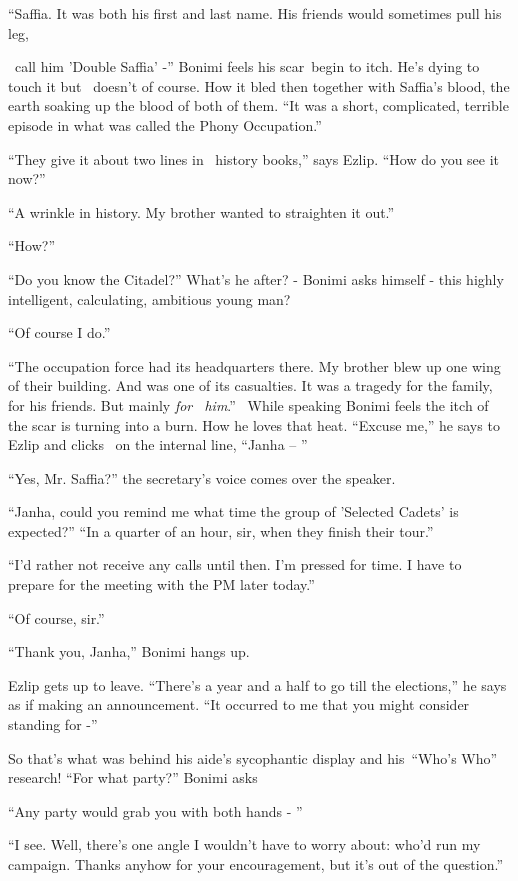 \documentclass[twoside,11pt]{book}
\begin{document}
``Saffia. It was both his first and last name. His friends would sometimes pull his leg,

\ call him 'Double Saffia' -'' Bonimi feels his scar~begin to itch. He's dying to touch it but \ doesn't of
course. How it bled then together with Saffia's blood, the earth soaking up the blood of both of them.
``It was a short, complicated, terrible episode in what was called the Phony Occupation.''

``They give it about two lines in \ history books,'' says Ezlip. ``How do you see
it now?''

``A wrinkle in history. My brother wanted to straighten it out.''

``How?''

``Do you know the Citadel?'' What's he after? - Bonimi asks himself - this highly intelligent,
calculating, ambitious young man?

``Of course I do.''

``The occupation force had its headquarters there. My brother blew up one wing of their building. And was
one of its casualties. It was a tragedy for the family, for his friends. But mainly \textit{for \ him}.''
\ While speaking Bonimi feels the itch of the scar is turning into a burn. How he loves that heat.
``Excuse me,'' he says to Ezlip and clicks \ on the internal line, ``Janha --
''

``Yes, Mr. Saffia?'' the secretary's voice comes over the speaker.

``Janha, could you remind me what time the group of 'Selected Cadets'{ }is
expected?'' ``In a quarter of an hour, sir, when they finish their tour.''

``I'd rather not receive any calls until then. I'm pressed for time. I have to prepare for the meeting with
the PM later today.''

``Of course, sir.''

``Thank you, Janha,'' Bonimi hangs up.

Ezlip gets up to leave. ``There's a year and a half to go till the elections,'' he says as if
making an announcement. ``It occurred to me that you might consider standing for -''

So that's what was behind his aide's sycophantic display{ }and his~``Who's
Who'' research! ``For what party?'' Bonimi asks

``Any party would grab you with both hands - ''

``I see. Well, there's one angle{ }I wouldn't have to worry about: who'd run my campaign.
Thanks anyhow for your encouragement, but it's out of the question.''
\end{document}
